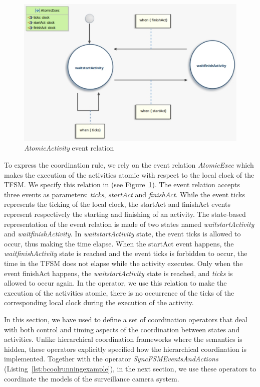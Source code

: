 \begin{figure}
	\center
	\includegraphics[width=.7\columnwidth]{examples/figs/AtomicExec}
	\caption{\emph{AtomicActivity} event relation}
	\label{fig:atomicexec}
\end{figure}

To express the coordination rule, we rely on the event relation \emph{AtomicExec} which makes the execution of the activities atomic with respect to the local clock of the TFSM. We specify this relation in \moccml (see Figure~\ref{fig:atomicexec}). The event relation accepts three events as parameters: \emph{ticks}, \emph{startAct} and \emph{finishAct}. While the event ticks represents the ticking of the local clock, the startAct and finishAct events represent respectively the starting and finishing of an activity. The state-based representation of the event relation is made of two states named \emph{waitstartActivity} and \emph{waitfinishActivity}. In \emph{waitstartActivity} state, the event ticks is allowed to occur, thus making the time elapse. When the startAct event happens, the \emph{waitfinishActivity} state is reached and the event ticks is forbidden to occur, \ie the time in the TFSM does not elapse while the activity executes. Only when the event finishAct happens, the \emph{waitstartActivity} state is reached, and \emph{ticks} is allowed to occur again. In the operator, we use this relation to make the execution of the activities atomic, \ie there is no occurrence of the \dse ticks of the corresponding local clock during the execution of the activity.

In this section, we have used \bcool to define a set of coordination operators that deal with both control and timing aspects of the coordination between states and activities. Unlike hierarchical coordination frameworks where the semantics is hidden, these operators explicitly specified how the hierarchical coordination is implemented. Together with the operator \emph{SyncFSMEventsAndActions} (Listing~\ref{lst:bcoolrunningexample}), in the next section, we use these operators to coordinate the models of the surveillance camera system.







